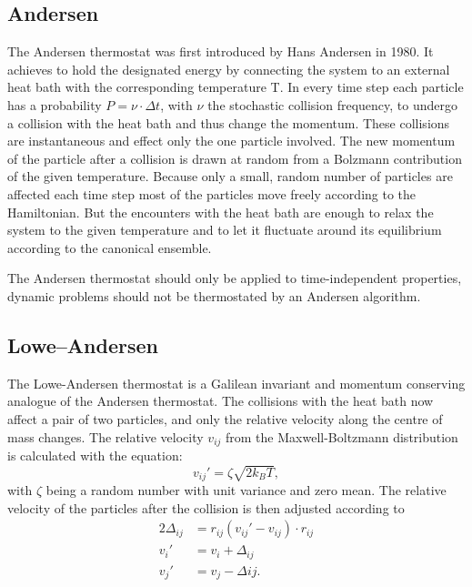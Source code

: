 \subsection{Andersen}

The Andersen thermostat was first introduced by Hans Andersen in 1980\cite{Andersen1}.
It achieves to hold the designated energy by connecting the system to an external heat bath with the corresponding temperature T.
In every time step each particle has a probability $P=\nu\cdot\Delta t$, with $\nu$ the stochastic collision frequency, to undergo a collision with the heat bath and thus change the momentum. These collisions are instantaneous and effect only the one particle involved.
The new momentum of the particle after a collision is drawn at random from a Bolzmann contribution of the given temperature.
Because only a small, random number of particles are affected each time step most of the particles move freely according to the Hamiltonian. But the encounters with the heat bath are enough to relax the system to the given temperature and to let it fluctuate around its equilibrium according to the canonical ensemble.

The Andersen thermostat should only be applied to time-independent properties, dynamic problems should not be thermostated by an Andersen algorithm\cite{Andersen2}.

\subsection{Lowe--Andersen}
The Lowe-Andersen thermostat is a Galilean invariant and momentum conserving analogue of the Andersen thermostat\cite{LoweAndersen}.
The collisions with the heat bath now affect a pair of two particles, and only the relative velocity along the centre of mass changes. The relative velocity $v_{ij}$ from the Maxwell-Boltzmann distribution is calculated with the equation:
\begin{equation}
v_{ij}'=\zeta\sqrt{2k_BT},
\end{equation}
with $\zeta$ being a random number with unit variance and zero mean.
The relative velocity of the particles after the collision is then adjusted according to
\begin{align}
2\Delta_{ij}&=r_{ij}(v_{ij}'-v_{ij})\cdot r_{ij}\\
v_i'&=v_i+\Delta_{ij}\\
v_j'&=v_j-\Delta{ij}.\\
\end{align}
